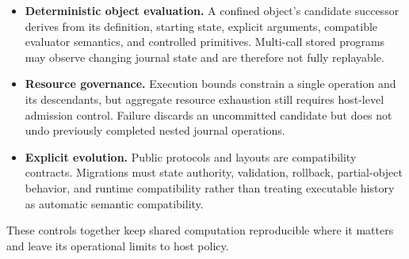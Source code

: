 \begin{itemize}[nosep]
  \item \textbf{Deterministic object evaluation.} A confined object's candidate successor derives from its definition, starting state, explicit arguments, compatible evaluator semantics, and controlled primitives. Multi-call stored programs may observe changing journal state and are therefore not fully replayable.
  \item \textbf{Resource governance.} Execution bounds constrain a single operation and its descendants, but aggregate resource exhaustion still requires host-level admission control. Failure discards an uncommitted candidate but does not undo previously completed nested journal operations.
  \item \textbf{Explicit evolution.} Public protocols and layouts are compatibility contracts. Migrations must state authority, validation, rollback, partial-object behavior, and runtime compatibility rather than treating executable history as automatic semantic compatibility.
\end{itemize}

These controls together keep shared computation reproducible where it matters and leave its operational limits to host policy.